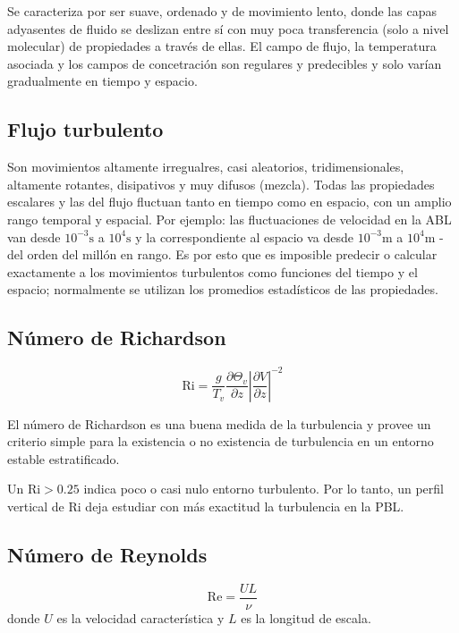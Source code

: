 \documentclass[openany]{book}
\begin{document}
Se caracteriza por ser suave, ordenado y de movimiento lento, donde 
las capas adyasentes de fluido se deslizan entre sí con muy poca 
transferencia (solo a nivel molecular) de propiedades a través de 
ellas. El campo de flujo, la temperatura asociada y los campos de 
concetración son regulares y predecibles y solo varían gradualmente 
en tiempo y espacio.

\subsection{Flujo turbulento}

Son movimientos altamente irregualres, casi aleatorios, 
tridimensionales, altamente rotantes, disipativos y muy difusos 
(mezcla). Todas las propiedades escalares y las del flujo 
fluctuan tanto en tiempo como en espacio, con un amplio rango 
temporal y espacial. Por ejemplo: las fluctuaciones de velocidad en 
la ABL van desde $10^{-3}\mathrm{s}$ a $10^4\mathrm{s}$ y la 
correspondiente al espacio va desde $10^{-3}\mathrm{m}$ a 
$10^4\mathrm{m}$ - del orden del millón en rango. Es por esto 
que es imposible predecir o calcular exactamente a los movimientos 
turbulentos como funciones del tiempo y el espacio; normalmente 
se utilizan los promedios estadísticos de las propiedades.

\subsection{Número de Richardson}
\begin{equation}
    \mathrm{Ri}=\frac{g}{T_{v}}\frac{\partial \Theta_{v}}{\partial z}\left|\frac{\partial V}{\partial z}\right|^{-2}
\end{equation}
\par El número de Richardson es una buena medida de la 
turbulencia y provee un criterio simple para la existencia o no 
existencia de turbulencia en un entorno estable estratificado.
\par Un $\mathrm{Ri}>0.25$ indica poco o casi nulo entorno 
turbulento. Por lo tanto, un perfil vertical de $\mathrm{Ri}$ 
deja estudiar con más exactitud la turbulencia en la PBL.

\subsection{Número de Reynolds}
\begin{equation}
    \mathrm{Re}=\frac{UL}{\nu}
\end{equation}
donde $U$ es la velocidad característica y $L$ es la longitud de 
escala.
\end{document}

